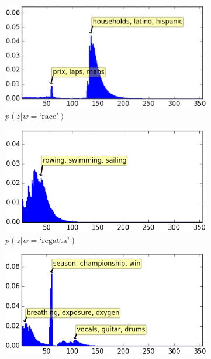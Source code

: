 \documentclass{article} %
\begin{document}
\begin{figure}
\centering
\begin{subfigure}{.49\textwidth}
  \centering
  \includegraphics[width=.99\linewidth]{p_z_race.png}
  \caption{$p(z|w=\text{`race'})$}
  \label{fig:sub1p}
\end{subfigure}
\begin{subfigure}{.49\textwidth}
  \centering
  \includegraphics[width=.99\linewidth]{p_z_w_for_regatta.png}
  \caption{$p(z|w=\text{`regatta'})$}
  \label{fig:sub2p}
\end{subfigure}
\begin{subfigure}{.49\textwidth}
  \centering
  \includegraphics[width=.99\linewidth]{p_z_w_for_lead.png}

\end{subfigure}
\end{figure}
\end{document}
